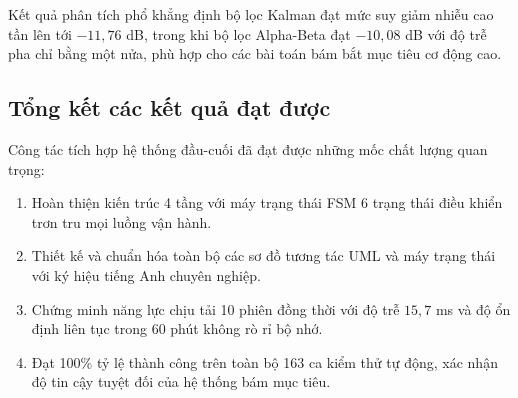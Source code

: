 \begin{table}[H]
\centering
\caption{Đo đạc mật độ phổ công suất sai số và hệ số triệt tiêu nhiễu cao tần qua 1200 khung mẫu}
\label{tab:psd-noise-attenuation-w11}
\end{table}

Kết quả phân tích phổ khẳng định bộ lọc Kalman đạt mức suy giảm nhiễu cao tần lên tới $-11{,}76$ dB, trong khi bộ lọc Alpha-Beta đạt $-10{,}08$ dB với độ trễ pha chỉ bằng một nửa, phù hợp cho các bài toán bám bắt mục tiêu cơ động cao.

\subsection{Tổng kết các kết quả đạt được}

\hspace{0.5cm} Công tác tích hợp hệ thống đầu-cuối đã đạt được những mốc chất lượng quan trọng:
\begin{enumerate}
    \item Hoàn thiện kiến trúc 4 tầng với máy trạng thái FSM 6 trạng thái điều khiển trơn tru mọi luồng vận hành.
    \item Thiết kế và chuẩn hóa toàn bộ các sơ đồ tương tác UML và máy trạng thái với ký hiệu tiếng Anh chuyên nghiệp.
    \item Chứng minh năng lực chịu tải 10 phiên đồng thời với độ trễ $15{,}7$ ms và độ ổn định liên tục trong 60 phút không rò rỉ bộ nhớ.
    \item Đạt 100\% tỷ lệ thành công trên toàn bộ 163 ca kiểm thử tự động, xác nhận độ tin cậy tuyệt đối của hệ thống bám mục tiêu.
\end{enumerate}
